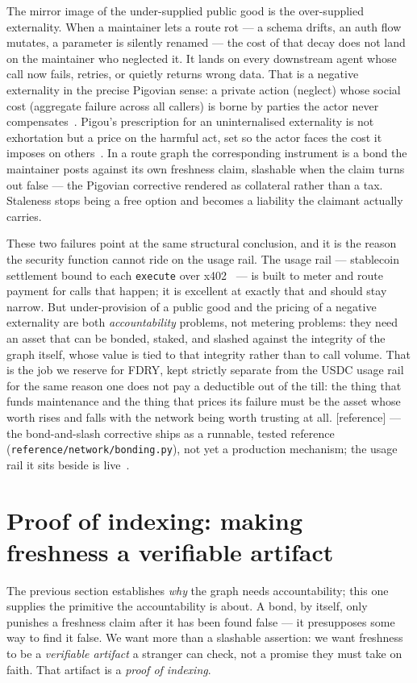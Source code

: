 \documentclass[11pt]{article}
\newcommand{\refimpl}{\textcolor{blue!70!black}{\small[reference]}}
\begin{document}
The mirror image of the under-supplied public good is the over-supplied
externality. When a maintainer lets a route rot --- a schema drifts, an auth flow
mutates, a parameter is silently renamed --- the cost of that decay does not land
on the maintainer who neglected it. It lands on every downstream agent whose call
now fails, retries, or quietly returns wrong data. That is a negative
externality in the precise Pigovian sense: a private action (neglect) whose social
cost (aggregate failure across all callers) is borne by parties the actor never
compensates~\cite{pigou}. Pigou's prescription for an uninternalised externality
is not exhortation but a price on the harmful act, set so the actor faces the cost
it imposes on others~\cite{pigou}. In a route graph the corresponding instrument
is a bond the maintainer posts against its own freshness claim, slashable when the
claim turns out false --- the Pigovian corrective rendered as collateral rather
than a tax. Staleness stops being a free option and becomes a liability the
claimant actually carries.

These two failures point at the same structural conclusion, and it is the reason
the security function cannot ride on the usage rail. The usage rail --- stablecoin
settlement bound to each \texttt{execute} over x402~\cite{x402} --- is built to
meter and route payment for calls that happen; it is excellent at exactly that and
should stay narrow. But under-provision of a public good and the pricing of a
negative externality are both \emph{accountability} problems, not metering
problems: they need an asset that can be bonded, staked, and slashed against the
integrity of the graph itself, whose value is tied to that integrity rather than
to call volume. That is the job we reserve for FDRY, kept
strictly separate from the USDC usage rail for the same reason one does not pay a
deductible out of the till: the thing that funds maintenance and the thing that
prices its failure must be the asset whose worth rises and falls with the network
being worth trusting at all. \refimpl{} --- the bond-and-slash corrective ships as
a runnable, tested reference (\texttt{reference/network/bonding.py}), not yet a
production mechanism; the usage rail it sits beside is live~\cite{x402}.

\section{Proof of indexing: making freshness a verifiable artifact}

The previous section establishes \emph{why} the graph needs accountability; this
one supplies the primitive the accountability is about. A bond, by itself, only
punishes a freshness claim after it has been found false --- it presupposes some way
to find it false. We want more than a slashable assertion: we want freshness to be
a \emph{verifiable artifact} a stranger can check, not a promise they must take on
faith. That artifact is a \emph{proof of indexing}.
\end{document}
